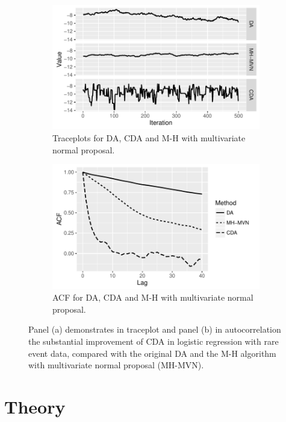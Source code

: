 \documentclass[10pt]{article}
\begin{document}
\begin{figure}[H]
  \begin{subfigure}[b]{0.49\textwidth}
 \includegraphics[width=1\textwidth]{logit_demo_trace_plot}
  \caption{Traceplots for DA, CDA and M-H with multivariate normal proposal.}
\end{subfigure}
  \hfill
   \begin{subfigure}[b]{0.49\textwidth}
 \includegraphics[width=1\textwidth]{logit_demo_acf}
  \caption{ACF for DA, CDA and M-H with multivariate normal proposal.}
\end{subfigure}
 \caption{Panel (a) demonstrates in traceplot and panel (b) in autocorrelation the substantial improvement of CDA in logistic regression with rare event data, compared with the original DA \citep{polson2013bayesian} and the M-H algorithm with multivariate normal proposal (MH-MVN).}
    \label{logit_random_mixing}
 \end{figure}




\section{Theory}
\end{document}
